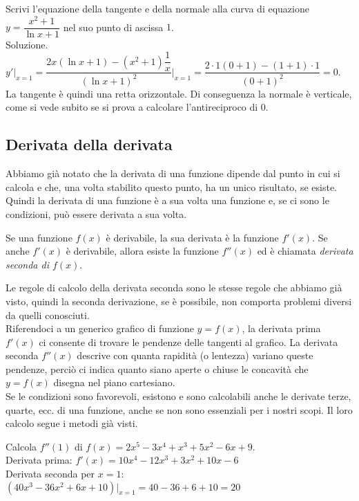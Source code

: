 \begin{esempio}
Scrivi l'equazione della tangente e della normale alla curva di equazione
$y=\dfrac{x^2+1}{\ln x +1}$ nel suo punto di ascissa $1$.\\
Soluzione. $y'|_{x=1}=\dfrac{2x(\ln x+1)-(x^2+1)\dfrac{1}{x}}
{(\ln x +1)^2}\bigg|_{x=1}=\dfrac{2\cdot 1(0+1)-(1+1)\cdot 1}{(0+1)^2}=0$.\\
La tangente è quindi una retta orizzontale. Di conseguenza la normale è 
verticale, come si vede subito se si prova a calcolare l'antireciproco di 
$0$.
\end{esempio}

\subsection{Derivata della derivata}
\label{}
Abbiamo già notato che la derivata  di una funzione dipende dal punto in 
cui si 
calcola e che, una volta stabilito questo punto, ha un unico risultato,
se esiste.
Quindi la derivata di una funzione è a sua volta una funzione e,
se ci sono le condizioni, può essere derivata a sua volta.
\begin{definizione}
 Se una funzione $f(x)$ è derivabile, la sua derivata è la funzione $f'(x)$.
 Se anche $f'(x)$ è derivabile, allora esiste la funzione $f''(x)$ ed è
 chiamata \emph{derivata seconda di $f(x)$}.
\end{definizione}
Le regole di calcolo della derivata seconda sono le stesse regole che 
abbiamo 
già visto, quindi la seconda derivazione, se è possibile, non comporta 
problemi 
diversi da quelli conosciuti.\\
Riferendoci a un generico grafico di funzione $y=f(x)$, la derivata prima 
$f'(x)$ ci consente di trovare le pendenze delle tangenti al grafico. La
derivata seconda $f''(x)$ descrive con quanta rapidità (o lentezza) variano 
queste pendenze, perciò ci indica quanto siano aperte o chiuse le concavità 
che
$y=f(x)$ disegna nel piano cartesiano.\\
Se le condizioni sono favorevoli, esistono e sono calcolabili anche le 
derivate 
terze, quarte, ecc. di una funzione, anche se non sono essenziali per i 
nostri 
scopi. Il loro calcolo segue i metodi già visti.

\begin{esempio}
Calcola $f''(1)$ di $f(x)=2x^5-3x^4+x^3+5x^2-6x+9$.\\
Derivata prima: $f'(x)=10 x^4-12 x^3+3x^2+10 x-6$\\
Derivata seconda per $x=1$: $(40x^3-36x^2+6x+10)|_{x=1}=40-36+6+10=20$
\end{esempio}

